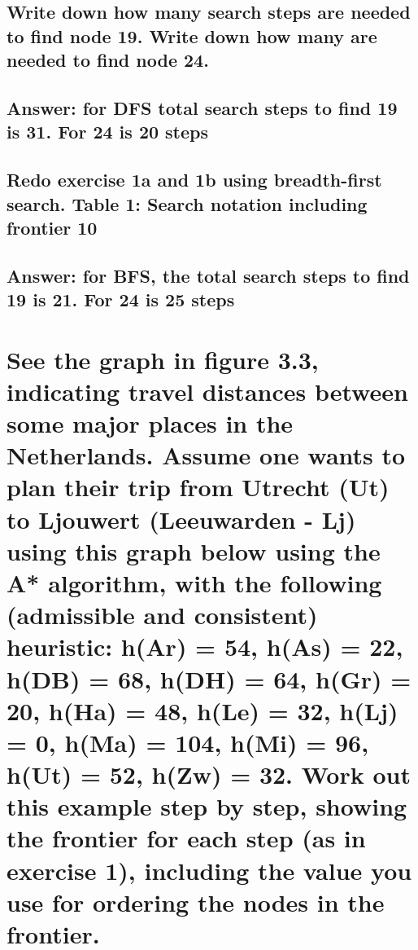 \documentclass[11px]{article}
\begin{document}
\subsection{\normalfont Write down how many search steps are needed to find node 19. Write down how many are needed to find node 24.}

\subsection*{Answer: for DFS total search steps to find 19 is 31. For 24 is 20 steps}

\subsection{\normalfont Redo exercise 1a and 1b using breadth-first search.
Table 1: Search notation including frontier 10}

\subsection*{Answer: for BFS, the total search steps to find 19 is 21. For 24 is 25 steps}

\section{\normalfont See the graph in figure 3.3, indicating travel distances between some major places in the Netherlands. Assume one wants to plan their trip from Utrecht (Ut) to Ljouwert (Leeuwarden - Lj) using this graph below using the A* algorithm, with the following (admissible and consistent) heuristic: h(Ar) = 54, h(As) = 22, h(DB) = 68, h(DH) = 64, h(Gr) = 20, h(Ha) = 48, h(Le) = 32, h(Lj) = 0, h(Ma) = 104, h(Mi) = 96, h(Ut) = 52, h(Zw) = 32. Work out this example step by step, showing the frontier for each step (as in exercise 1), including the value you use for ordering the nodes in the frontier.}
\end{document}
